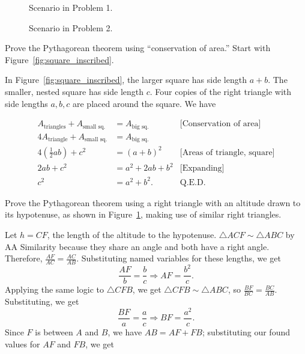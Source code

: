 \documentclass[../gatm_answers.tex]{subfiles}
\begin{document}
\begin{figure}[h]
\begin{center}
\begin{minipage}[b]{0.45\textwidth}
\begin{asy}[width=0.7\textwidth]
			\end{asy}
		\end{minipage}
	\end{center}
	\vspace*{-2\baselineskip}
	\begin{center}
		\begin{minipage}[t]{0.45\textwidth}
			\caption{Scenario in Problem 1.}
			\label{fig:square_inscribed}
		\end{minipage}
		\hfill
		\begin{minipage}[t]{0.45\textwidth}
			\caption{Scenario in Problem 2.}
			\label{fig:pythag_sim_tri}
		\end{minipage}
	\end{center}
	\vspace*{-2\baselineskip}
\end{figure}

\begin{outer_problem}
\item Prove the Pythagorean theorem using ``conservation of area.'' Start with Figure~\ref{fig:square_inscribed}.
\end{outer_problem}

\noindent In Figure~\ref{fig:square_inscribed}, the larger square has side length $a+b$. The smaller, nested square has side length $c$. Four copies of the right triangle with side lengths $a,b,c$ are placed around the square. We have

\begin{align*}
A_{\text{triangles}} + A_{\text{small sq.}} &= A_{\text{big sq.}} & \text{[Conservation of area]} \\
4A_{\text{triangle}} + A_{\text{small sq.}} &= A_{\text{big sq.}} \\
4\left(\frac{1}{2}ab\right) + c^2 &= (a+b)^2 & \text{[Areas of triangle, square]} \\
2ab + c^2 &= a^2+2ab+b^2 & \text{[Expanding]} \\
c^2 &= a^2+b^2. & \text{Q.E.D.}
\end{align*}

\begin{outer_problem}
\item Prove the Pythagorean theorem using a right triangle with an altitude drawn to its hypotenuse, as shown in Figure~\ref{fig:pythag_sim_tri}, making use of similar right triangles.
\end{outer_problem}

\noindent Let $h=CF$, the length of the altitude to the hypotenuse. $\triangle ACF\sim \triangle ABC$ by AA Similarity because they share an angle and both have a right angle. Therefore, $\frac{AF}{AC}=\frac{AC}{AB}$. Substituting named variables for these lengths, we get $$\frac{AF}{b}=\frac{b}{c}\Longrightarrow AF = \frac{b^2}{c}.$$ Applying the same logic to $\triangle CFB$,
 we get $\triangle CFB\sim \triangle ABC$, so $\frac{BF}{BC}=\frac{BC}{AB}.$ Substituting, we get $$\frac{BF}{a}=\frac{a}{c} \Longrightarrow BF=\frac{a^2}{c}.$$ Since $F$ is between $A$ and $B$, we have $AB=AF+FB$; substituting our found values for $AF$ and $FB$, we get
\end{document}
